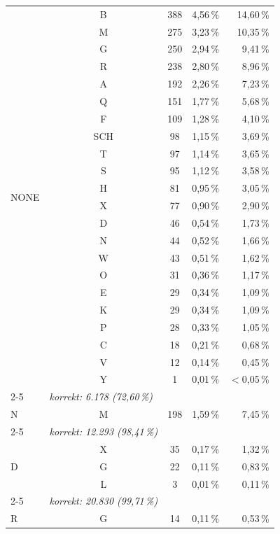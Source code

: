 \begin{longtable}{lccrr}
\multirow{22}{*}{NONE}
  & B   & 388 & 4,56\,\% & 14,60\,\% \\
  & M   & 275 & 3,23\,\% & 10,35\,\% \\
  & G   & 250 & 2,94\,\% & 9,41\,\% \\
  & R   & 238 & 2,80\,\% & 8,96\,\% \\
  & A   & 192 & 2,26\,\% & 7,23\,\% \\
  & Q   & 151 & 1,77\,\% & 5,68\,\% \\
  & F   & 109 & 1,28\,\% & 4,10\,\% \\
  & SCH &  98 & 1,15\,\% & 3,69\,\% \\
  & T   &  97 & 1,14\,\% & 3,65\,\% \\
  & S   &  95 & 1,12\,\% & 3,58\,\% \\
  & H   &  81 & 0,95\,\% & 3,05\,\% \\
  & X   &  77 & 0,90\,\% & 2,90\,\% \\
  & D   &  46 & 0,54\,\% & 1,73\,\% \\
  & N   &  44 & 0,52\,\% & 1,66\,\% \\
  & W   &  43 & 0,51\,\% & 1,62\,\% \\
  & O   &  31 & 0,36\,\% & 1,17\,\% \\
  & E   &  29 & 0,34\,\% & 1,09\,\% \\
  & K   &  29 & 0,34\,\% & 1,09\,\% \\
  & P   &  28 & 0,33\,\% & 1,05\,\% \\
  & C   &  18 & 0,21\,\% & 0,68\,\% \\
  & V   &  12 & 0,14\,\% & 0,45\,\% \\
  & Y   &   1 & 0,01\,\% & $<$0,05\,\% \\
\cmidrule{2-5}
  & \multicolumn{1}{l}{\emph{korrekt: 6.178 (72,60\,\%)}} & & & \\
\midrule
\multirow{1}{*}{N}
  & M   & 198 & 1,59\,\% & 7,45\,\% \\
\cmidrule{2-5}
  & \multicolumn{1}{l}{\emph{korrekt: 12.293 (98,41\,\%)}} & & & \\
\midrule
\multirow{3}{*}{D}
  & X   &  35 & 0,17\,\% & 1,32\,\% \\
  & G   &  22 & 0,11\,\% & 0,83\,\% \\
  & L   &   3 & 0,01\,\% & 0,11\,\% \\
\cmidrule{2-5}
  & \multicolumn{1}{l}{\emph{korrekt: 20.830 (99,71\,\%)}} & & & \\
\midrule
\multirow{5}{*}{R}
  & G   &  14 & 0,11\,\% & 0,53\,\% \\

\end{longtable}
